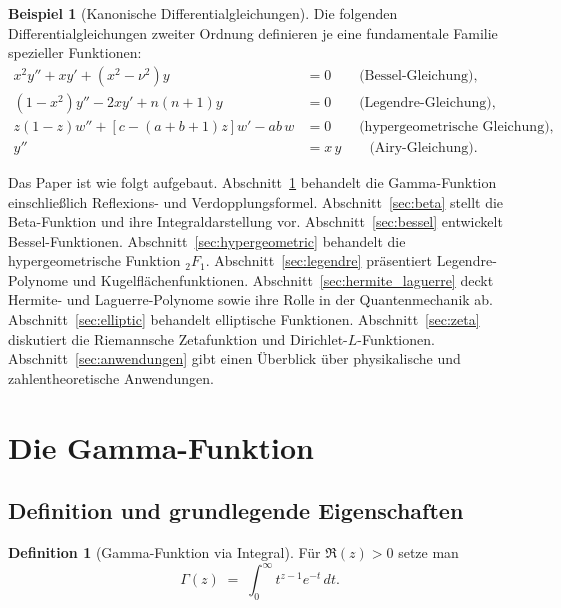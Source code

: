\documentclass[12pt,a4paper]{amsart}
\theoremstyle{definition}
\newtheorem{definition}[theorem]{Definition}
\newtheorem{example}[theorem]{Beispiel}
\begin{document}
\begin{example}[Kanonische Differentialgleichungen]
Die folgenden Differentialgleichungen zweiter Ordnung definieren je eine fundamentale
Familie spezieller Funktionen:
\begin{align}
  x^2 y'' + x y' + (x^2 - \nu^2)y &= 0 \qquad \text{(Bessel-Gleichung)},\label{eq:bessel_ode}\\
  (1-x^2)y'' - 2xy' + n(n+1)y &= 0 \qquad \text{(Legendre-Gleichung)},\label{eq:legendre_ode}\\
  z(1-z)w'' + [c-(a+b+1)z]w' - ab\,w &= 0 \qquad \text{(hypergeometrische Gleichung)},\label{eq:hyp_ode}\\
  y'' &= x\,y \qquad \text{(Airy-Gleichung)}.\label{eq:airy_ode}
\end{align}
\end{example}

Das Paper ist wie folgt aufgebaut.
Abschnitt~\ref{sec:gamma} behandelt die Gamma-Funktion einschließlich Reflexions- und
Verdopplungsformel.  Abschnitt~\ref{sec:beta} stellt die Beta-Funktion und ihre
Integraldarstellung vor.  Abschnitt~\ref{sec:bessel} entwickelt Bessel-Funktionen.
Abschnitt~\ref{sec:hypergeometric} behandelt die hypergeometrische Funktion \({}_2F_1\).
Abschnitt~\ref{sec:legendre} präsentiert Legendre-Polynome und Kugelflächenfunktionen.
Abschnitt~\ref{sec:hermite_laguerre} deckt Hermite- und Laguerre-Polynome sowie ihre
Rolle in der Quantenmechanik ab.  Abschnitt~\ref{sec:elliptic} behandelt elliptische
Funktionen.  Abschnitt~\ref{sec:zeta} diskutiert die Riemannsche Zetafunktion und
Dirichlet-\(L\)-Funktionen.  Abschnitt~\ref{sec:anwendungen} gibt einen Überblick über
physikalische und zahlentheoretische Anwendungen.

\section{Die Gamma-Funktion}
\label{sec:gamma}

\subsection{Definition und grundlegende Eigenschaften}

\begin{definition}[Gamma-Funktion via Integral]
Für \(\Re(z) > 0\) setze man
\[
  \Gamma(z) \;=\; \int_0^\infty t^{z-1} e^{-t}\,dt.
\]
\end{definition}
\end{document}
